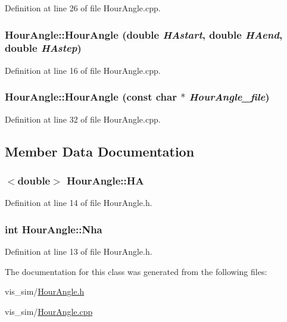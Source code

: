 Definition at line 26 of file HourAngle.cpp.

\hypertarget{classHourAngle_a560a6d4f0dcba1f563b2acd5aaab022d}{
\subsubsection[{HourAngle}]{\setlength{\rightskip}{0pt plus 5cm}HourAngle::HourAngle (double {\em HAstart}, \/  double {\em HAend}, \/  double {\em HAstep})}}
\label{classHourAngle_a560a6d4f0dcba1f563b2acd5aaab022d}


Definition at line 16 of file HourAngle.cpp.

\hypertarget{classHourAngle_a86943a5f61aec13c2a98411163cd223a}{
\subsubsection[{HourAngle}]{\setlength{\rightskip}{0pt plus 5cm}HourAngle::HourAngle (const char $\ast$ {\em HourAngle\_\-file})}}
\label{classHourAngle_a86943a5f61aec13c2a98411163cd223a}


Definition at line 32 of file HourAngle.cpp.



\subsection{Member Data Documentation}
\hypertarget{classHourAngle_a2bbd1e4c34cf9c2f2294affb1abfff48}{
\subsubsection[{HA}]{$<$double$>$ {\bf HourAngle::HA}}}
\label{classHourAngle_a2bbd1e4c34cf9c2f2294affb1abfff48}


Definition at line 14 of file HourAngle.h.

\hypertarget{classHourAngle_ac1d985530e4291043ac8be2b9e4c5d5f}{
\subsubsection[{Nha}]{\setlength{\rightskip}{0pt plus 5cm}int {\bf HourAngle::Nha}}}
\label{classHourAngle_ac1d985530e4291043ac8be2b9e4c5d5f}


Definition at line 13 of file HourAngle.h.



The documentation for this class was generated from the following files:\begin{DoxyCompactItemize}
\item 
vis\_\-sim/\hyperlink{HourAngle_8h}{HourAngle.h}\item 
vis\_\-sim/\hyperlink{HourAngle_8cpp}{HourAngle.cpp}\end{DoxyCompactItemize}
